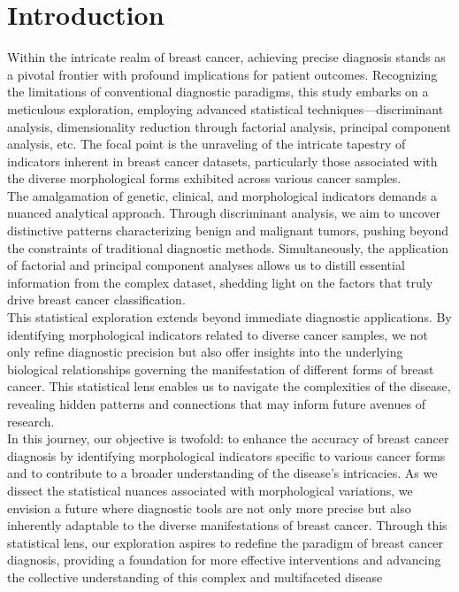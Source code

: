 \documentclass[10pt,a4paper]{article}
\theoremstyle{definition}
\theoremstyle{definition}
\begin{document}
\newpage

\section{Introduction}
Within the intricate realm of breast cancer, achieving precise diagnosis stands as a pivotal frontier with profound implications for patient outcomes. Recognizing the limitations of conventional diagnostic paradigms, this study embarks on a meticulous exploration, employing advanced statistical techniques—discriminant analysis, dimensionality reduction through factorial analysis, principal component analysis, etc. The focal point is the unraveling of the intricate tapestry of indicators inherent in breast cancer datasets, particularly those associated with the diverse morphological forms exhibited across various cancer samples. \\

The amalgamation of genetic, clinical, and morphological indicators demands a nuanced analytical approach. Through discriminant analysis, we aim to uncover distinctive patterns characterizing benign and malignant tumors, pushing beyond the constraints of traditional diagnostic methods. Simultaneously, the application of factorial and principal component analyses allows us to distill essential information from the complex dataset, shedding light on the factors that truly drive breast cancer classification. \\

This statistical exploration extends beyond immediate diagnostic applications. By identifying morphological indicators related to diverse cancer samples, we not only refine diagnostic precision but also offer insights into the underlying biological relationships governing the manifestation of different forms of breast cancer. This statistical lens enables us to navigate the complexities of the disease, revealing hidden patterns and connections that may inform future avenues of research. \\

In this journey, our objective is twofold: to enhance the accuracy of breast cancer diagnosis by identifying morphological indicators specific to various cancer forms and to contribute to a broader understanding of the disease's intricacies. As we dissect the statistical nuances associated with morphological variations, we envision a future where diagnostic tools are not only more precise but also inherently adaptable to the diverse manifestations of breast cancer. Through this statistical lens, our exploration aspires to redefine the paradigm of breast cancer diagnosis, providing a foundation for more effective interventions and advancing the collective understanding of this complex and multifaceted disease
\end{document}
